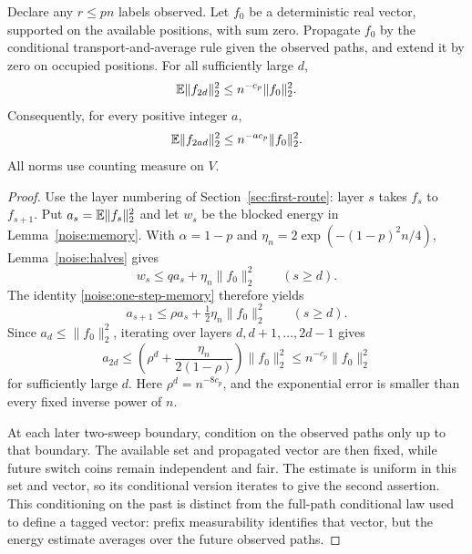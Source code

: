 \begin{lemma}\label{lem:base-path-energy}
Declare any $r\le pn$ labels observed. Let $f_0$ be a deterministic
real vector, supported on the available positions, with sum zero.
Propagate $f_0$ by the conditional transport-and-average rule given
the observed paths, and extend it by zero on occupied positions.
For all sufficiently large $d$,
\[
 \mathbb E\|f_{2d}\|_2^2\le n^{-c_p}\|f_0\|_2^2.
\]
Consequently, for every positive integer $a$,
\[
 \mathbb E\|f_{2ad}\|_2^2\le n^{-a c_p}\|f_0\|_2^2.
\]
All norms use counting measure on $V$.
\end{lemma}

\begin{proof}
Use the layer numbering of Section~\ref{sec:first-route}: layer $s$
takes $f_s$ to $f_{s+1}$. Put $a_s=\mathbb E\|f_s\|_2^2$ and let $w_s$
be the blocked energy in Lemma~\ref{noise:memory}. With
$\alpha=1-p$ and
$\eta_n=2\exp(-(1-p)^2n/4)$, Lemma~\ref{noise:halves} gives
\[
 w_s\le q a_s+\eta_n\|f_0\|_2^2\qquad(s\ge d).
\]
The identity \eqref{noise:one-step-memory} therefore yields
\begin{equation}\label{eq:base-noise}
 a_{s+1}\le\rho a_s+\tfrac12\eta_n\|f_0\|_2^2
 \qquad(s\ge d).
\end{equation}
Since $a_d\le\|f_0\|_2^2$, iterating over layers
$d,d+1,\ldots,2d-1$ gives
\[
 a_{2d}\le
 \left(\rho^d+\frac{\eta_n}{2(1-\rho)}\right)\|f_0\|_2^2
 \le n^{-c_p}\|f_0\|_2^2
\]
for sufficiently large $d$. Here $\rho^d=n^{-8c_p}$, and the
exponential error is smaller than every fixed inverse power of $n$.

At each later two-sweep boundary, condition on the observed paths only
up to that boundary. The available set and propagated vector are then
fixed, while future switch coins remain independent and fair. The
estimate is uniform in this set and vector, so its conditional version
iterates to give the second assertion. This conditioning on the past
is distinct from the full-path conditional law used to define a tagged
vector: prefix measurability identifies that vector, but the energy
estimate averages over the future observed paths.
\end{proof}

